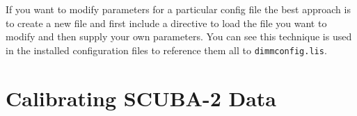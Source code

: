 \documentclass[twoside,11pt]{article}
\newcommand{\xlabel}[1]{}
\renewcommand{\_}{\texttt{\symbol{95}}}
\begin{document}
\begin{description}



\end{description}

If you want to modify parameters for a particular config file the best
approach is to create a new file and first include a directive to load
the file you want to modify and then supply your own parameters. You
can see this technique is used in the installed configuration files to
reference them all to \texttt{dimmconfig.lis}.

\section{\xlabel{calib}Calibrating SCUBA-2 Data}
\label{sec:calib}
\end{document}
